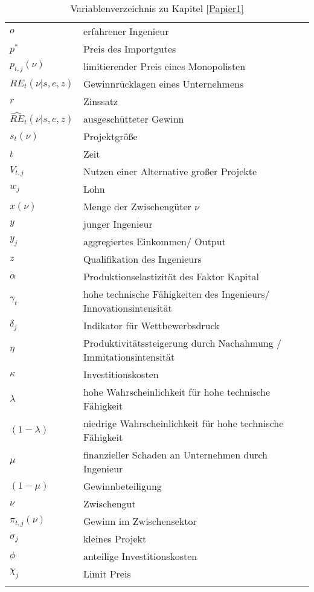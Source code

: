 \begin{center}
\begin{longtable}{|l|l|}
		$o$ & erfahrener Ingenieur\\
		$p^*$ & Preis des Importgutes\\
		$p_{t,j}(\nu)$ & limitierender Preis eines Monopolisten\\
		$RE_{t}(\nu|s,e,z)$ & Gewinnrücklagen eines Unternehmens\\
		$r$ & Zinssatz\\
		$\hat{{RE}}_{t}(\nu|s,e,z)$ & ausgeschütteter Gewinn\\
		$s_{t}(\nu)$ & Projektgr\"o{\ss}e\\
		$t$ & Zeit\\
		$V_{t,j}$ & Nutzen einer Alternative gro\ss{}er Projekte\\
		$w_{j}$ & Lohn\\
		$x(\nu)$ & Menge der Zwischeng\"uter $\nu$\\
		$y$ & junger Ingenieur\\
		$y_{j}$ & aggregiertes Einkommen/ Output \\
		$z$ & Qualifikation des Ingenieurs\\
		$\alpha$ & Produktionselastizit\"at des Faktor Kapital\\
		$\gamma_{t}$ & hohe technische F\"ahigkeiten des Ingenieurs/ Innovationsintensität\\
		$\delta_{j}$ & Indikator f\"ur Wettbewerbsdruck\\
		$\eta$ & Produktivitätssteigerung durch Nachahmung / Immitationsintensität\\
		$\kappa$ & Investitionskosten\\
		$\lambda $ & hohe Wahrscheinlichkeit f\"ur hohe technische F\"ahigkeit\\
		$(1-\lambda)$ & niedrige Wahrscheinlichkeit f\"ur hohe technische F\"ahigkeit\\
		$\mu$ & finanzieller Schaden an Unternehmen durch Ingenieur\\
		$(1-\mu)$ & Gewinnbeteiligung\\
		$\nu$ & Zwischengut\\
		$\pi_{t,j}(\nu)$ & Gewinn im Zwischensektor\\%
		$\sigma_{j}$ & kleines Projekt\\
		$\phi$ & anteilige Investitionskosten\\
		$\chi_{j}$ & Limit Preis\\ \hline
		
\caption{Variablenverzeichnis zu Kapitel \ref{Papier1}}
\end{longtable}
\end{center}